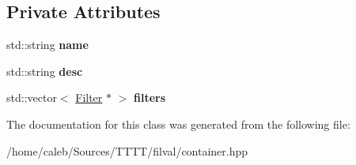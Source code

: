 \subsection*{Private Attributes}
\begin{DoxyCompactItemize}
\item 
\hypertarget{classfilval_1_1GenContainer_a2165e51b25330d6e5400bd6ecd70eab0}{}\label{classfilval_1_1GenContainer_a2165e51b25330d6e5400bd6ecd70eab0} 
std\+::string {\bfseries name}
\item 
\hypertarget{classfilval_1_1GenContainer_a57d8a54b45952c5ce7c97b50dd225f3b}{}\label{classfilval_1_1GenContainer_a57d8a54b45952c5ce7c97b50dd225f3b} 
std\+::string {\bfseries desc}
\item 
\hypertarget{classfilval_1_1GenContainer_a8694356b6e23118df57e2178db069d17}{}\label{classfilval_1_1GenContainer_a8694356b6e23118df57e2178db069d17} 
std\+::vector$<$ \hyperlink{classfilval_1_1Filter}{Filter} $\ast$ $>$ {\bfseries filters}
\end{DoxyCompactItemize}


The documentation for this class was generated from the following file\+:\begin{DoxyCompactItemize}
\item 
/home/caleb/\+Sources/\+T\+T\+T\+T/filval/container.\+hpp\end{DoxyCompactItemize}
